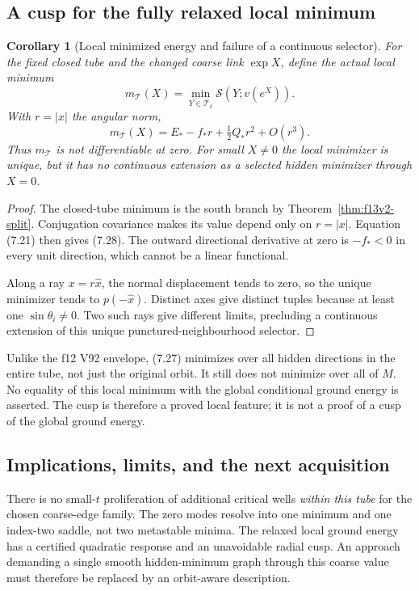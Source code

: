 \documentclass[11pt,oneside]{article}
\newtheorem{corollary}[theorem]{Corollary}
\newcommand{\cS}{\mathcal S}
\newcommand{\cT}{\mathcal T}
\begin{document}
\subsection{A cusp for the fully relaxed local minimum}

\begin{corollary}[Local minimized energy and failure of a continuous selector]
\label{cor:f13v2-cusp}
For the fixed closed tube and
the changed coarse link
\(\exp X\), define the actual
local minimum
\[
        m_{\cT}(X)=\min_{Y\in\overline{\cT_\delta}}
                             \cS(Y;v(e^X)).
 \tag{7.27}
\]
With \(r=|x|\) the angular norm,
\[
        m_{\cT}(X)=E_*-f_*r+\tfrac12Q_*r^2+O(r^3).
 \tag{7.28}
\]
Thus \(m_{\cT}\) is not
differentiable at zero. For
small \(X\ne0\) the local
minimizer is unique, but it
has no continuous extension
as a selected hidden minimizer
through \(X=0\).
\end{corollary}
\begin{proof}
The closed-tube minimum is the
south branch by
Theorem~\ref{thm:f13v2-split}.
Conjugation covariance makes
its value depend only on
\(r=|x|\). Equation (7.21)
then gives (7.28). The
outward directional derivative
at zero is \(-f_*<0\) in
every unit direction, which
cannot be a linear functional.

Along a ray \(x=r\widehat x\),
the normal displacement tends
to zero, so the unique
minimizer tends to
\(p(-\widehat x)\).
Distinct axes give distinct
tuples because at least one
\(\sin\theta_i\ne0\).
Two such rays give different
limits, precluding a continuous
extension of this unique
punctured-neighbourhood selector.
\end{proof}

Unlike the f12 V92 envelope,
(7.27) minimizes over all hidden
directions in the entire tube,
not just the original orbit.
It still does not minimize
over all of \(M\).
No equality of this local
minimum with the global
conditional ground energy
is asserted. The cusp is
therefore a proved local
feature; it is not a proof
of a cusp of the global
ground energy.

\subsection{Implications, limits, and the next acquisition}

There is no small-\(t\) proliferation
of additional critical wells
\emph{within this tube} for
the chosen coarse-edge family.
The zero modes resolve into
one minimum and one index-two
saddle, not two metastable
minima. The relaxed local
ground energy has a certified
quadratic response and an
unavoidable radial cusp.
An approach demanding a
single smooth hidden-minimum
graph through this coarse
value must therefore be
replaced by an orbit-aware
description.
\end{document}
